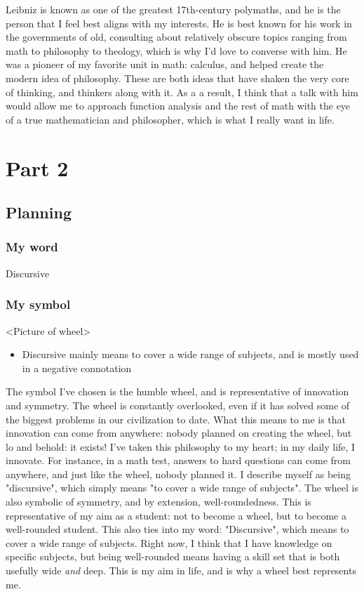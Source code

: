 \documentclass[]{article}
\begin{document}
Leibniz is known as one of the greatest 17th-century polymaths, and he is the person that I feel best aligns with my interests. He is best known for his work in the governments of old, consulting about relatively obscure topics ranging from math to philosophy to theology, which is why I'd love to converse with him. 
He was a pioneer of my favorite unit in math: calculus, and helped create the modern idea of philosophy. These are both ideas that have shaken the very core of thinking, and thinkers along with it. As a a result, I think that a talk with him would allow me to approach function analysis and the rest of math with the eye of a true mathematician and philosopher, which is what I really want in life.


\section*{Part 2}
\subsection*{Planning}
\subsubsection*{My word}
Discursive
\subsubsection*{My symbol}
<Picture of wheel>

\begin{itemize}
    \item Discursive mainly means to cover a wide range of subjects, and is mostly used in a negative connotation
\end{itemize}

The symbol I've chosen is the humble wheel, and is representative of innovation and symmetry. The wheel is constantly overlooked, even if it has solved some of the biggest problems in our civilization to date. What this means to me is that innovation can come from anywhere: nobody planned on creating the wheel, but lo and behold: it exists! I've taken this philosophy to my heart; in my daily life, I innovate. For instance, in a math test, answers to hard questions can come from anywhere, and just like the wheel, nobody planned it. I describe myself as being "discursive", which simply means "to cover a wide range of subjects". The wheel is also symbolic of symmetry, and by extension, well-roundedness. This is representative of my aim as a student: not to become a wheel, but to become a well-rounded student. This also ties into my word: "Discursive", which means to cover a wide range of subjects. Right now, I think that I have knowledge on specific subjects, but being well-rounded means having a skill set that is both usefully wide \textit{and} deep. This is my aim in life, and is why a wheel best represents me.
\end{document}
